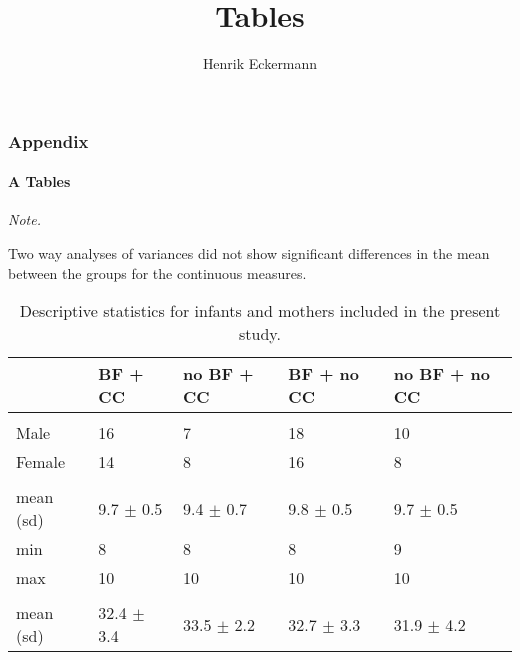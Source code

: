 \documentclass[]{article}
\title{Tables}
\author{Henrik Eckermann}
\date{}
\let\oldparagraph\paragraph
\renewcommand{\paragraph}[1]{\oldparagraph{#1}\mbox{}}
\begin{document}
\maketitle

\newpage

\newpage 

\subsubsection{Appendix}\label{appendix}

\paragraph{A Tables}\label{a-tables}

\begin{ThreePartTable}
\begin{TableNotes}[para]
\item \textit{Note.} 
\item Two way analyses of variances did not show significant differences in the mean between the groups for the continuous measures.
\end{TableNotes}
\begin{longtabu} to 
\caption{\label{tab:unnamed-chunk-3}Descriptive statistics for infants and mothers included in the present study.}\\
\toprule
 & BF + CC & no BF + CC & BF + no CC & no BF + no CC\\
\midrule
\addlinespace[0.3em]
\\
\hspace{1em}Male & 16 & 7 & 18 & 10\\
\hspace{1em}Female & 14 & 8 & 16 & 8\\
\addlinespace[0.3em]
\\
\hspace{1em}mean (sd) & 9.7 $\pm$ 0.5 & 9.4 $\pm$ 0.7 & 9.8 $\pm$ 0.5 & 9.7 $\pm$ 0.5\\
\hspace{1em}min & 8 & 8 & 8 & 9\\
\hspace{1em}max & 10 & 10 & 10 & 10\\
\addlinespace[0.3em]
\\
\hspace{1em}mean (sd) & 32.4 $\pm$ 3.4 & 33.5 $\pm$ 2.2 & 32.7 $\pm$ 3.3 & 31.9 $\pm$ 4.2\\

\end{longtabu}
\end{ThreePartTable}
\end{document}
